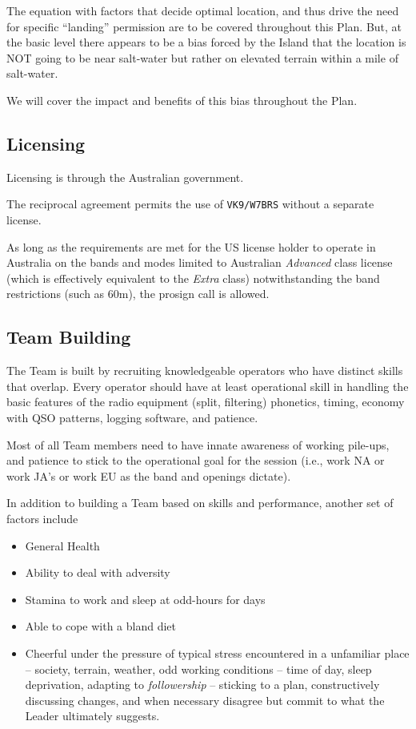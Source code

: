 \documentclass[11pt]{article}
\begin{document}
\par
The equation with factors that decide optimal location, and thus
drive the need for specific ``landing'' permission are to be covered
throughout this Plan.  But, at the basic level there appears to be
a bias forced by the Island that the location is NOT going to be near
salt-water but rather on elevated terrain within a mile of salt-water.
\par
We will cover the impact and benefits of this bias throughout the
Plan.

\subsection{Licensing}

Licensing is through the Australian government.

\par
The reciprocal agreement permits the use of {\texttt{VK9/W7BRS}}
without a separate license.
\par
As long as the requirements are met for the US license holder
to operate in Australia on the bands and modes limited to
Australian {\textit{Advanced}} class license (which is effectively
equivalent to the {\textit{Extra}} class) notwithstanding the 
band restrictions (such as 60m), the prosign call is allowed.

\subsection{Team Building}
The Team is built by recruiting knowledgeable operators who have
distinct skills that overlap.   Every operator should have
at least operational skill in handling the basic features of
the radio equipment (split, filtering) phonetics, timing,
economy with QSO patterns, logging software, and patience.
\par
Most of all Team members need to have innate awareness of
working pile-ups, and patience to stick to the operational
goal for the session (i.e., work NA or work JA's or work EU
as the band and openings dictate).
\par
In addition to building a Team based on skills and performance,
another set of factors include
\begin{itemize}
\item General Health
\item Ability to deal with adversity
\item Stamina to work and sleep at odd-hours for days
\item Able to cope with a bland diet
\item Cheerful under the pressure of typical stress encountered
in a unfamiliar place -- society, terrain, weather, odd working
conditions -- time of day, sleep deprivation, adapting to 
{\textit{followership}} -- sticking to a plan, constructively 
discussing changes, and when necessary disagree but commit to what
the Leader ultimately suggests.
\end{itemize}
\end{document}
